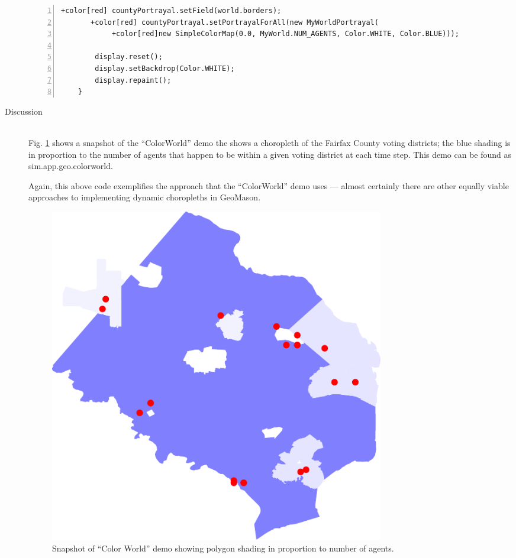 \documentclass[twoside,10pt]{book}
\newcommand\file[1]{\textsf{#1}}
\newcommand\class[1]{\index{Classes!{#1}}\textsf{#1}}
\begin{document}
\begin{description}
\begin{Verbatim}[frame=lines,label=Set up portrayal in \class{GUIState},framesep=5mm,numbers=left,commandchars=+\[\]]
       +color[red] countyPortrayal.setField(world.borders);
       +color[red] countyPortrayal.setPortrayalForAll(new MyWorldPortrayal(
            +color[red]new SimpleColorMap(0.0, MyWorld.NUM_AGENTS, Color.WHITE, Color.BLUE)));

        display.reset();
        display.setBackdrop(Color.WHITE);
        display.repaint();
    }
\end{Verbatim}


\item[Discussion]~\\
Fig. \ref{fig:colorworld} shows a snapshot of the ``ColorWorld'' demo
the shows a choropleth of the Fairfax County voting districts; the
blue shading is in proportion to the number of agents that happen to
be within a given voting district at each time step.  This demo can be
found as \file{sim.app.geo.colorworld}.

Again, this above code exemplifies the approach that the ``ColorWorld'' demo uses ---
almost certainly there are other equally viable approaches to
implementing dynamic choropleths in GeoMason.

\begin{figure}[ht]
  \centering
  \includegraphics[width=0.75\textwidth]{ColorWorld.pdf}
  \caption{Snapshot of ``Color World'' demo showing polygon shading in
    proportion to number of agents.}
  \label{fig:colorworld}
\end{figure}

\end{description}



\end{document}
